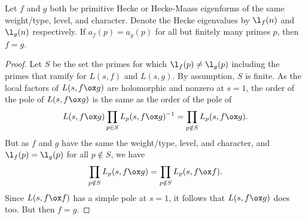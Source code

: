       \begin{theorem}
        Let $f$ and $g$ both be primitive Hecke or Hecke-Maass eigenforms of the same weight/type, level, and character. Denote the Hecke eigenvalues by $\l_{f}(n)$ and $\l_{g}(n)$ respectively. If $a_{f}(p) = a_{g}(p)$ for all but finitely many primes $p$, then $f = g$.
      \end{theorem}
      \begin{proof}
        Let $S$ be the set the primes for which $\l_{f}(p) \neq \l_{g}(p)$ including the primes that ramify for $L(s,f)$ and $L(s,g)$. By assumption, $S$ is finite. As the local factors of $L(s,f \ox g)$ are holomorphic and nonzero at $s = 1$, the order of the pole of $L(s,f \ox g)$ is the same as the order of the pole of
        \[
          L(s,f \ox g)\prod_{p \in S}L_{p}(s,f \ox g)^{-1} = \prod_{p \notin S}L_{p}(s,f \ox g).
        \]
        But as $f$ and $g$ have the same the weight/type, level, and character, and $\l_{f}(p) = \l_{g}(p)$ for all $p \notin S$, we have
        \[
          \prod_{p \notin S}L_{p}(s,f \ox g) = \prod_{p \notin S}L_{p}(s,f \ox f).
        \]
        Since $L(s,f \ox f)$ has a simple pole at $s = 1$, it follows that $L(s,f \ox g)$ does too. But then $f = g$.
      \end{proof}